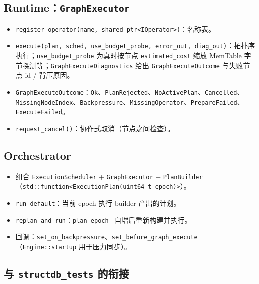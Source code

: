 \subsection{Runtime：\texttt{GraphExecutor}}


\begin{itemize}
  \item \texttt{register\_operator(name, shared\_ptr<IOperator>)}：名称表。
  \item \texttt{execute(plan, sched, use\_budget\_probe, error\_out, diag\_out)}：拓扑序执行；\texttt{use\_budget\_probe} 为真时按节点 \texttt{estimated\_cost} 缩放 MemTable 字节探测等；\texttt{GraphExecuteDiagnostics} 给出 \texttt{GraphExecuteOutcome} 与失败节点 id / 背压原因。
  \item \texttt{GraphExecuteOutcome}：\texttt{Ok}、\texttt{PlanRejected}、\texttt{NoActivePlan}、\texttt{Cancelled}、\texttt{MissingNodeIndex}、\texttt{Backpressure}、\texttt{MissingOperator}、\texttt{PrepareFailed}、\texttt{ExecuteFailed}。
  \item \texttt{request\_cancel()}：协作式取消（节点之间检查）。
\end{itemize}

\subsection{Orchestrator}


\begin{itemize}
  \item 组合 \texttt{ExecutionScheduler} + \texttt{GraphExecutor} + \texttt{PlanBuilder}（\texttt{std::function<ExecutionPlan(uint64\_t epoch)>}）。
  \item \texttt{run\_default}：当前 epoch 执行 builder 产出的计划。
  \item \texttt{replan\_and\_run}：\texttt{plan\_epoch\_} 自增后重新构建并执行。
  \item 回调：\texttt{set\_on\_backpressure}、\texttt{set\_before\_graph\_execute}（\texttt{Engine::startup} 用于压力同步）。
\end{itemize}

\subsection{与 \texttt{structdb\_tests} 的衔接}

